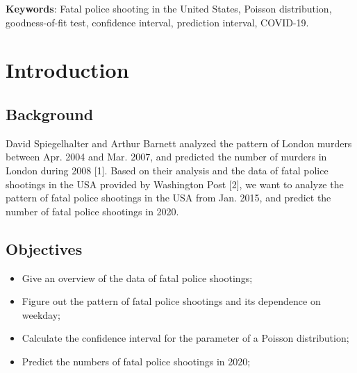\documentclass[a4paper]{article}
\begin{document}
\noindent\textbf{Keywords}: Fatal police shooting in the United States, Poisson distribution, goodness-of-fit test, confidence interval, prediction interval, COVID-19.



\newpage

\tableofcontents

\newpage

















\section{Introduction}
	\subsection{Background}
	David Spiegelhalter and Arthur Barnett analyzed the pattern of London murders between Apr. 2004 and Mar. 2007, and predicted the number of murders in London during 2008 [1]. Based on their analysis and the data of fatal police shootings in the USA provided by Washington Post [2], we want to analyze the pattern of fatal police shootings in the USA from Jan. 2015, and predict the number of fatal police shootings in 2020.

	\subsection{Objectives}
	\begin{itemize}
	\item Give an overview of the data of fatal police shootings;
	\item Figure out the pattern of fatal police shootings and its dependence on weekday;
	\item Calculate the confidence interval for the parameter of a Poisson distribution;
	\item Predict the numbers of fatal police shootings in 2020;
	\end{itemize}
\end{document}
